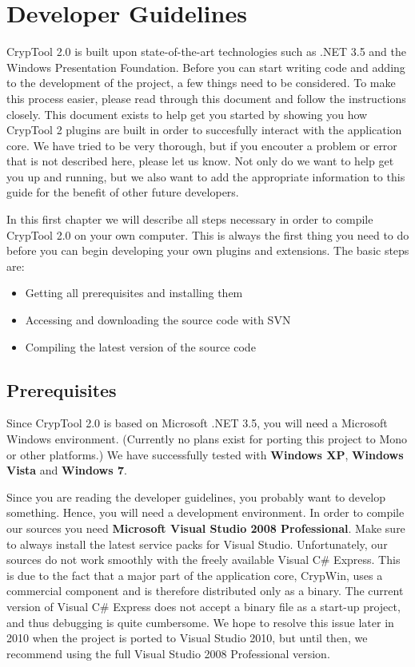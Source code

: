 \chapter{Developer Guidelines}
\label{DeveloperGuidelines}

CrypTool 2.0 is built upon state-of-the-art technologies such as .NET 3.5 and the Windows Presentation Foundation. Before you can start writing code and adding to the development of the project, a few things need to be considered. To make this process easier, please read through this document and follow the instructions closely. This document exists to help get you started by showing you how CrypTool 2 plugins are built in order to succesfully interact with the application core. We have tried to be very thorough, but if you encouter a problem or error that is not described here, please let us know. Not only do we want to help get you up and running, but we also want to add the appropriate information to this guide for the benefit of other future developers.

In this first chapter we will describe all steps necessary in order to compile CrypTool 2.0 on your own computer. This is always the first thing you need to do before you can begin developing your own plugins and extensions. The basic steps are:
\begin{itemize}
	\item Getting all prerequisites and installing them
	\item Accessing and downloading the source code with SVN
	\item Compiling the latest version of the source code
\end{itemize}

\section{Prerequisites}
\label{Prerequisites}

Since CrypTool 2.0 is based on Microsoft .NET 3.5, you will need a Microsoft Windows environment. (Currently no plans exist for porting this project to Mono or other platforms.) We have successfully tested with \textbf{Windows XP}, \textbf{Windows Vista} and \textbf{Windows 7}.

Since you are reading the developer guidelines, you probably want to develop something. Hence, you will need a development environment. In order to compile our sources you need \textbf{Microsoft Visual Studio 2008 Professional}. Make sure to always install the latest service packs for Visual Studio. Unfortunately, our sources do not work smoothly with the freely available Visual C\# Express. This is due to the fact that a major part of the application core, CrypWin, uses a commercial component and is therefore distributed only as a binary. The current version of Visual C\# Express does not accept a binary file as a start-up project, and thus debugging is quite cumbersome. We hope to resolve this issue later in 2010 when the project is ported to Visual Studio 2010, but until then, we recommend using the full Visual Studio 2008 Professional version.


